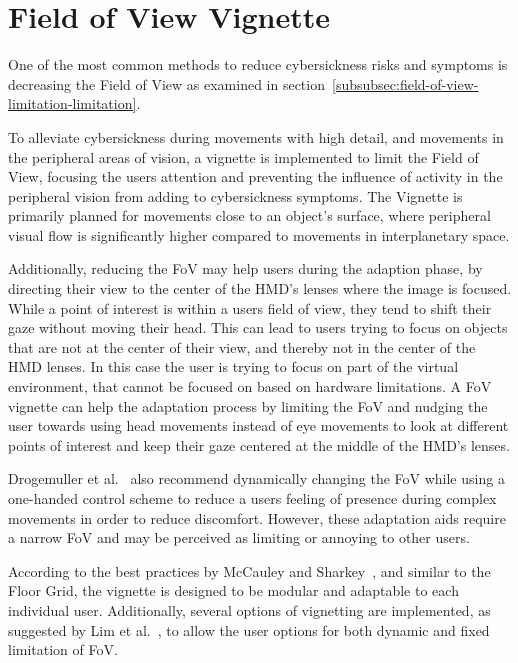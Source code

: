 \section{Field of View Vignette}\label{sec:field-of-view-vignette}

One of the most common methods to reduce cybersickness risks and symptoms is decreasing the Field of
View as examined in section~\ref{subsubsec:field-of-view-limitation-limitation}.

To alleviate cybersickness during movements with high detail, and movements in the peripheral areas of vision, a
vignette is implemented to limit the Field of View, focusing the users attention and preventing the influence of
activity in the peripheral vision from adding to cybersickness symptoms.
The Vignette is primarily planned for movements close to an object's surface, where peripheral visual flow is
significantly higher compared to movements in interplanetary space.

Additionally, reducing the FoV may help users during the adaption phase, by directing their view to the center of the
HMD's lenses where the image is focused.
While a point of interest is within a users field of view, they tend to shift their gaze without moving their head.
This can lead to users trying to focus on objects that are not at the center of their view, and thereby not in the
center of the HMD lenses.
In this case the user is trying to focus on part of the virtual environment, that cannot be focused on based on
hardware limitations.
A FoV vignette can help the adaptation process by limiting the FoV and nudging the user towards using head movements
instead of eye movements to look at different points of interest and keep their gaze centered at the middle of the
HMD's lenses.

Drogemuller et al.~\cite{Drogemuller2020} also recommend dynamically changing the FoV while using a one-handed
control scheme to reduce a users feeling of presence during complex movements in order to reduce discomfort.
However, these adaptation aids require a narrow FoV and may be perceived as limiting or annoying to other users.

According to the best practices by McCauley and Sharkey~\cite{McCauley1992}, and similar to the Floor Grid, the
vignette is designed to be modular and adaptable to each individual user.
Additionally, several options of vignetting are implemented, as suggested by Lim et al.~\cite{Lim2020}, to allow the
user options for both dynamic and fixed limitation of FoV\@.


